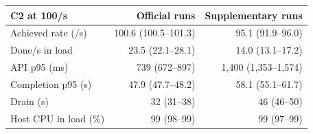 \begin{tabular}{lrr}
\toprule
C2 at 100/s & Official runs & Supplementary runs \\
\midrule
Achieved rate (/s) & 100.6 (100.5--101.3) & 95.1 (91.9--96.0) \\
Done/s in load & 23.5 (22.1--28.1) & 14.0 (13.1--17.2) \\
API p95 (ms) & 739 (672--897) & 1,400 (1,353--1,574) \\
Completion p95 (s) & 47.9 (47.7--48.2) & 58.1 (55.1--61.7) \\
Drain (s) & 32 (31--38) & 46 (46--50) \\
Host CPU in load (\%) & 99 (98--99) & 99 (97--99) \\
\bottomrule
\end{tabular}
